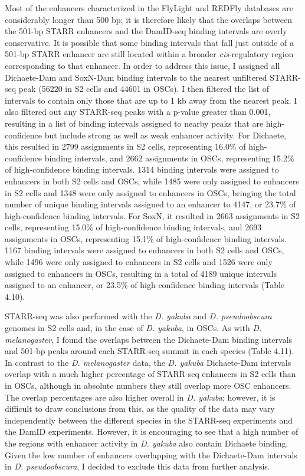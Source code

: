 Most of the enhancers characterized in the FlyLight and REDFly databases are considerably longer than 500 bp; it is therefore likely that the overlaps between the 501-bp STARR enhancers and the DamID-seq binding intervals are overly conservative. It is possible that some binding intervals that fall just outside of a 501-bp STARR enhancer are still located within a broader \emph{cis}-regulatory region corresponding to that enhancer. In order to address this issue, I assigned all Dichaete-Dam and SoxN-Dam binding intervals to the nearest unfiltered STARR-seq peak (56220 in S2 cells and 44601 in OSCs). I then filtered the list of intervals to contain only those that are up to 1 kb away from the nearest peak. I also filtered out any STARR-seq peaks with a p-value greater than 0.001, resulting in a list of binding intervals assigned to nearby peaks that are high-confidence but include strong as well as weak enhancer activity. For Dichaete, this resulted in 2799 assignments in S2 cells, representing 16.0\% of high-confidence binding intervals, and 2662 assignments in OSCs, representing 15.2\% of high-confidence binding intervals. 1314 binding intervals were assigned to enhancers in both S2 cells and OSCs, while 1485 were only assigned to enhancers in S2 cells and 1348 were only assigned to enhancers in OSCs, bringing the total number of unique binding intervals assigned to an enhancer to 4147, or 23.7\% of high-confidence binding intervals. For SoxN, it resulted in 2663 assignments in S2 cells, representing 15.0\% of high-confidence binding intervals, and 2693 assignments in OSCs, representing 15.1\% of high-confidence binding intervals. 1167 binding intervals were assigned to enhancers in both S2 cells and OSCs, while 1496 were only assigned to enhancers in S2 cells and 1526 were only assigned to enhancers in OSCs, resulting in a total of 4189 unique intervals assigned to an enhancer, or 23.5\% of high-confidence binding intervals (Table 4.10).

STARR-seq was also performed with the \emph{D. yakuba} and \emph{D. pseudoobscura} genomes in S2 cells and, in the case of \emph{D. yakuba}, in OSCs. As with \emph{D. melanogaster}, I found the overlaps between the Dichaete-Dam binding intervals and 501-bp peaks around each STARR-seq summit in each species (Table 4.11). In contrast to the \emph{D. melanogaster} data, the \emph{D. yakuba} Dichaete-Dam intervals overlap with a much higher percentage of STARR-seq enhancers in S2 cells than in OSCs, although in absolute numbers they still overlap more OSC enhancers. The overlap percentages are also higher overall in \emph{D. yakuba}; however, it is difficult to draw conclusions from this, as the quality of the data may vary independently between the different species in the STARR-seq experiments and the DamID experiments. However, it is encouraging to see that a high number of the regions with enhancer activity in \emph{D. yakuba} also contain Dichaete binding. Given the low number of enhancers overlapping with the Dichaete-Dam intervals in \emph{D. pseudoobscura}, I decided to exclude this data from further analysis.

